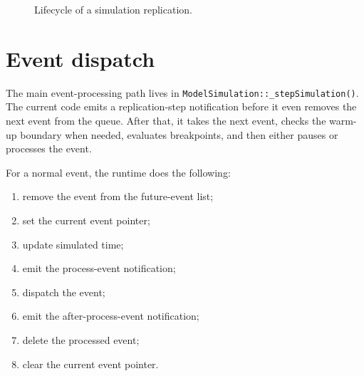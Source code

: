 \begin{figure}[htbp]
\centering
\caption{Lifecycle of a simulation replication.}
\label{fig:event-scheduling-replication-lifecycle}
\end{figure}

\section{Event dispatch}
\label{sec:event-scheduling-dispatch}

The main event-processing path lives in \texttt{ModelSimulation::\_stepSimulation()}.
The current code emits a replication-step notification before it even removes
the next event from the queue. After that, it takes the next event, checks the
warm-up boundary when needed, evaluates breakpoints, and then either pauses or
processes the event.

For a normal event, the runtime does the following:
\begin{enumerate}
\item remove the event from the future-event list;
\item set the current event pointer;
\item update simulated time;
\item emit the process-event notification;
\item dispatch the event;
\item emit the after-process-event notification;
\item delete the processed event;
\item clear the current event pointer.
\end{enumerate}

